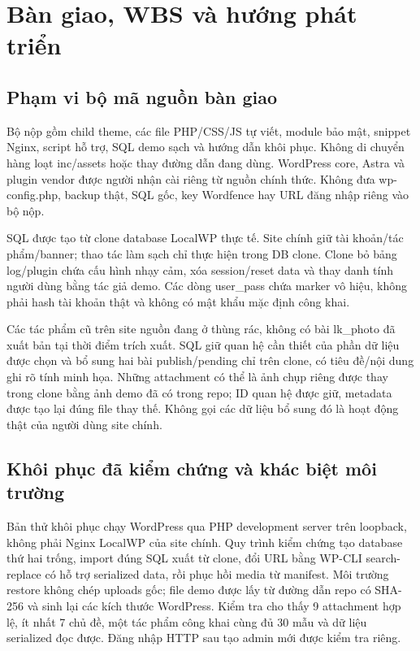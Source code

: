 \chapter{Bàn giao, WBS và hướng phát triển}
\label{ch:handover}
\section{Phạm vi bộ mã nguồn bàn giao}
Bộ nộp gồm child theme, các file PHP/CSS/JS tự viết, module bảo mật, snippet Nginx, script hỗ trợ, SQL demo sạch và hướng dẫn khôi phục. Không di chuyển hàng loạt inc/assets hoặc thay đường dẫn đang dùng. WordPress core, Astra và plugin vendor được người nhận cài riêng từ nguồn chính thức. Không đưa wp-config.php, backup thật, SQL gốc, key Wordfence hay URL đăng nhập riêng vào bộ nộp.

SQL được tạo từ clone database LocalWP thực tế. Site chính giữ tài khoản/tác phẩm/banner; thao tác làm sạch chỉ thực hiện trong DB clone. Clone bỏ bảng log/plugin chứa cấu hình nhạy cảm, xóa session/reset data và thay danh tính người dùng bằng tác giả demo. Các dòng user\_pass chứa marker vô hiệu, không phải hash tài khoản thật và không có mật khẩu mặc định công khai.

Các tác phẩm cũ trên site nguồn đang ở thùng rác, không có bài lk\_photo đã xuất bản tại thời điểm trích xuất. SQL giữ quan hệ cần thiết của phần dữ liệu được chọn và bổ sung hai bài publish/pending chỉ trên clone, có tiêu đề/nội dung ghi rõ tính minh họa. Những attachment có thể là ảnh chụp riêng được thay trong clone bằng ảnh demo đã có trong repo; ID quan hệ được giữ, metadata được tạo lại đúng file thay thế. Không gọi các dữ liệu bổ sung đó là hoạt động thật của người dùng site chính.

\section{Khôi phục đã kiểm chứng và khác biệt môi trường}
Bản thử khôi phục chạy WordPress qua PHP development server trên loopback, không phải Nginx LocalWP của site chính. Quy trình kiểm chứng tạo database thứ hai trống, import đúng SQL xuất từ clone, đổi URL bằng WP-CLI search-replace có hỗ trợ serialized data, rồi phục hồi media từ manifest. Môi trường restore không chép uploads gốc; file demo được lấy từ đường dẫn repo có SHA-256 và sinh lại các kích thước WordPress. Kiểm tra cho thấy 9 attachment hợp lệ, ít nhất 7 chủ đề, một tác phẩm công khai cùng đủ 30 mẫu và dữ liệu serialized đọc được. Đăng nhập HTTP sau tạo admin mới được kiểm tra riêng.

